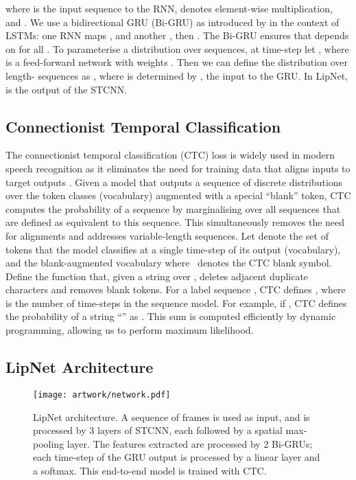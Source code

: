\documentclass{article}
\begin{document}
where  is the input sequence to the RNN,  denotes element-wise multiplication, and .
We use a bidirectional GRU (Bi-GRU) as introduced by \cite{graves2005framewise} in the context of LSTMs: one RNN maps , and another , then . The Bi-GRU ensures that  depends on  for all .
To parameterise a distribution over sequences, at time-step  let , where  is a feed-forward network with weights . Then we can define the distribution over length- sequences as , where  is determined by , the input to the GRU. In LipNet,  is the output of the STCNN.

\subsection{Connectionist Temporal Classification}
\label{sec:ctc}

The connectionist temporal classification (CTC) loss \citep{graves2006connectionist} is widely used in modern speech recognition as it eliminates the need for training data that aligns inputs to target outputs \citep{amodei2015deep,graves2014towards,maas2015lexicon}. Given a model that outputs a sequence of discrete distributions over the token classes (vocabulary) augmented with a special ``blank'' token, CTC computes the probability of a sequence by marginalising over all sequences that are defined as equivalent to this sequence. This simultaneously removes the need for alignments and addresses variable-length sequences. 
Let  denote the set of tokens that the model classifies at a single time-step of its output (vocabulary), and the blank-augmented vocabulary  where \textvisiblespace{}~denotes the CTC blank symbol. Define the function  that, given a string over , deletes adjacent duplicate characters and removes blank tokens. For a label sequence , CTC defines , where  is the number of time-steps in the sequence model.
For example, if , CTC defines the probability of a string ``'' as .
This sum is computed efficiently by dynamic programming, allowing us to perform maximum likelihood.

\subsection{LipNet Architecture}
\begin{figure}[tb]
  \centering
  \texttt{[image: artwork/network.pdf]}
  \vspace{-1.5em}
  \caption{LipNet architecture. A sequence of  frames is used as input, and is processed by 3 layers of STCNN, each followed by a spatial max-pooling layer. The features extracted are processed by 2 Bi-GRUs; each time-step of the GRU output is processed by a linear layer and a softmax. This end-to-end model is trained with CTC.}  \label{fig:net-arch}
    \vspace{-1.em}
\end{figure}
\end{document}
